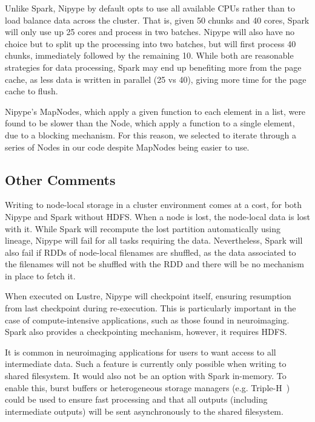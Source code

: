\documentclass{IEEEtran}
\newcommand{\todo}[1]{\marginpar{\parbox{18mm}{\flushleft\tiny\color{red}\textbf{TODO}:
      #1}}}
\begin{document}
Unlike Spark, Nipype by default opts to use all available CPUs rather 
than to load balance data across the cluster. That is, given 50 chunks 
and 40 cores, Spark will only use up 25 cores and process in two batches.
Nipype will also have no choice 
but to split up the processing into two batches, but will first process 
40 chunks, immediately followed by the remaining 10. While both are 
reasonable strategies for data processing, Spark may end up benefiting 
more from the page cache, as less data is written in parallel (25 vs 
40), giving more time for the page cache to flush.

Nipype's MapNodes, which apply a given function to each element in 
a list, were found to be slower than the Node, which apply a function 
to a single element, due to a blocking mechanism. For this reason, we 
selected to iterate through a series of Nodes in our code despite MapNodes being
easier to use.


\subsection{Other Comments}

Writing to node-local storage in a cluster environment comes at a cost, for both
Nipype and Spark without HDFS. When a node is lost, the node-local data is lost
with it. While Spark will recompute the lost partition automatically using lineage, 
Nipype will fail for all tasks requiring the data. Nevertheless, Spark will also fail if 
RDDs of node-local filenames are shuffled, as the data associated to the filenames
will not be shuffled with the RDD and there will be no mechanism in place to fetch it.

When executed on Lustre, Nipype will checkpoint itself, ensuring resumption from
last checkpoint during re-execution. This is particularly important in the case of compute-intensive 
applications, such as those found in neuroimaging. Spark also provides a checkpointing
mechanism, however, it requires HDFS.

It is common in neuroimaging applications for users to want access to all intermediate
data. Such a feature is currently only possible when writing to shared filesystem. 
It would also not be an option with Spark in-memory. To enable this, burst buffers or 
heterogeneous storage managers (e.g. Triple-H~\cite{islam2015triple}) could be used to ensure
fast processing and that all outputs (including intermediate outputs) will be 
sent asynchronously to the shared filesystem.
\end{document}
